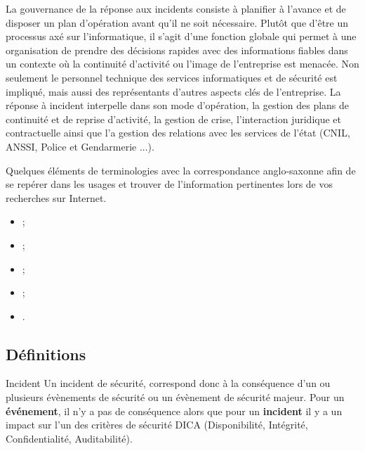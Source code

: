 La gouvernance de la réponse aux incidents consiste à planifier à l'avance et  de disposer un plan d'opération avant qu'il ne soit nécessaire. Plutôt que d'être un processus axé sur l'informatique, il s'agit d'une fonction  globale qui permet à une organisation de prendre des décisions rapides avec des informations fiables dans un contexte où la continuité d'activité ou l'image de l'entreprise est menacée. Non seulement le personnel technique des services informatiques et de sécurité est impliqué, mais aussi des représentants d'autres aspects clés de l'entreprise. La réponse à incident  interpelle  dans son mode d'opération, la gestion des plans de continuité et de reprise d'activité, la gestion de crise,  l'interaction juridique et contractuelle  ainsi que l'a gestion des relations avec les services de l'état (CNIL, ANSSI, Police et Gendarmerie ...). 

Quelques éléments de terminologies avec la correspondance anglo-saxonne afin de se repérer dans les usages et trouver de l'information pertinentes lors de vos recherches sur Internet.

\begin{itemize}
		\item {};
		\item{};
		\item {};
		\item {};
		\item {}.
\end{itemize}

\subsection{Définitions}

\begin{notebox}{Incident}
Un incident de sécurité, correspond donc à la conséquence d’un ou plusieurs évènements de sécurité ou un évènement de sécurité majeur. Pour un \textbf{événement}, il n'y a pas de conséquence alors que pour un \textbf{incident} il y a un impact sur l’un des critères de sécurité DICA (Disponibilité, Intégrité, Confidentialité, Auditabilité).
\end{notebox}

